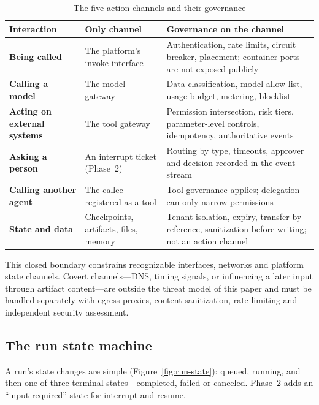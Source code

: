 \begin{table}[htbp]
\centering
\caption{The five action channels and their governance}
\label{tab:windows}
\begin{tabularx}{\textwidth}{@{}>{\bfseries}L{3.0cm}L{4.4cm}Y@{}}
  \toprule
  \textbf{Interaction} & \textbf{Only channel} & \textbf{Governance on the channel}\\
  \midrule
  Being called & The platform's invoke interface & Authentication, rate limits, circuit breaker, placement; container ports are not exposed publicly\\
  Calling a model & The model gateway & Data classification, model allow-list, usage budget, metering, blocklist\\
  Acting on external systems & The tool gateway & Permission intersection, risk tiers, parameter-level controls, idempotency, authoritative events\\
  Asking a person & An interrupt ticket (Phase~2) & Routing by type, timeouts, approver and decision recorded in the event stream\\
  Calling another agent & The callee registered as a tool & Tool governance applies; delegation can only narrow permissions\\
  State and data & Checkpoints, artifacts, files, memory & Tenant isolation, expiry, transfer by reference, sanitization before writing; not an action channel\\
  \bottomrule
\end{tabularx}
\end{table}

This closed boundary constrains recognizable interfaces, networks and platform state channels. Covert channels---DNS, timing signals, or influencing a later input through artifact content---are outside the threat model of this paper and must be handled separately with egress proxies, content sanitization, rate limiting and independent security assessment.

\subsection{The run state machine}

A run's state changes are simple (Figure~\ref{fig:run-state}): queued, running, and then one of three terminal states---completed, failed or canceled. Phase~2 adds an ``input required'' state for interrupt and resume.

